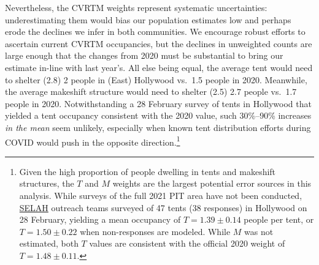 \documentclass[11pt]{article}
\def\selah{SELAH}
\begin{document}
Nevertheless, the CVRTM weights represent systematic uncertainties: underestimating them would bias
our population estimates low and perhaps erode the declines we infer in both communities. We encourage robust
efforts to ascertain current CVRTM occupancies, but the declines in unweighted counts are large enough that 
the changes from 2020 must be substantial to bring our estimate in-line with last year's. All else being equal, 
the average tent would need to shelter (2.8) 2 people in (East) Hollywood vs.\ 1.5 people in 2020. Meanwhile, 
the average makeshift structure would need to shelter (2.5) 2.7 people vs.\ 1.7 people in 2020. Notwithstanding
a 28 February survey of tents in Hollywood that yielded a tent occupancy consistent with the 2020 value, 
such 30\%--90\% increases {\it in the mean} seem unlikely, especially when known tent distribution efforts 
during COVID would push in the opposite direction.\footnote{Given the high proportion of people dwelling in tents
and makeshift structures, the $T$ and $M$ weights are the largest potential error sources in this analysis. While 
surveys of the full 2021 PIT area have not been conducted, \href{https://selahnch.org}{\selah} outreach teams 
surveyed of 47 tents (38 responses) in Hollywood on 28 February, yielding a mean occupancy of 
$T=1.39\pm0.14$ people per tent, or $T=1.50\pm0.22$ when non-responses are modeled. While $M$ was
not estimated, both $T$ values are consistent with the official 2020 weight of $T=1.48\pm0.11$.}
\end{document}

